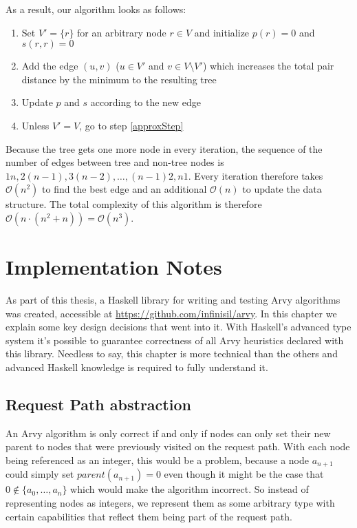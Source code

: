 \documentclass[a4paper, oneside]{discothesis}
\begin{document}
As a result, our algorithm looks as follows:
\begin{enumerate}
\item Set $V'=\{r\}$ for an arbitrary node $r\in V$ and initialize $p(r)=0$ and $s(r,r)=0$
\item Add the edge $(u,v)$ ($u\in V'$ and $v\in V\setminus V'$) which increases the total pair distance by the minimum to the resulting tree
\label{approxStep}
\item Update $p$ and $s$ according to the new edge
\item Unless $V'=V$, go to step \ref{approxStep}
\end{enumerate}

Because the tree gets one more node in every iteration, the sequence of the number of edges between tree and non-tree nodes is $1n,2(n-1),3(n-2),\dots,(n-1)2,n1$. Every iteration therefore takes $\mathcal{O}(n^2)$ to find the best edge and an additional $\mathcal{O}(n)$ to update the data structure. The total complexity of this algorithm is therefore $\mathcal{O}(n\cdot(n^2+n))=\mathcal{O}(n^3)$.


\chapter{Implementation Notes}

As part of this thesis, a Haskell library for writing and testing Arvy algorithms was created, accessible at \url{https://github.com/infinisil/arvy}. In this chapter we explain some key design decisions that went into it. With Haskell's advanced type system it's possible to guarantee correctness of all Arvy heuristics declared with this library. Needless to say, this chapter is more technical than the others and advanced Haskell knowledge is required to fully understand it.

\section{Request Path abstraction}

An Arvy algorithm is only correct if and only if nodes can only set their new parent to nodes that were previously visited on the request path. With each node being referenced as an integer, this would be a problem, because a node $a_{n+1}$ could simply set $parent(a_{n+1})=0$ even though it might be the case that $0\notin\{a_0,\dots,a_n\}$ which would make the algorithm incorrect. So instead of representing nodes as integers, we represent them as some arbitrary type with certain capabilities that reflect them being part of the request path.
\end{document}

